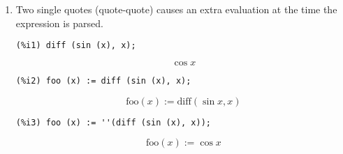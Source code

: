 \documentclass[12pt,leqno]{article}
\begin{document}
\begin{enumerate}
\item Two single quotes (quote-quote) causes an extra evaluation at the time the expression is parsed.
\begin{verbatim}
(%i1) diff (sin (x), x);
\end{verbatim}
\begin{equation}
\cos x\tag{\%o1}
\label{eq:doc-group1-code17-1-1}
\end{equation}
\begin{verbatim}
(%i2) foo (x) := diff (sin (x), x);
\end{verbatim}
\begin{equation}
\mathrm{foo}\left(x\right):=\mathrm{diff}\left(\sin x , x\right)\tag{\%o2}
\label{eq:doc-group1-code17-2-1}
\end{equation}
\begin{verbatim}
(%i3) foo (x) := ''(diff (sin (x), x));
\end{verbatim}
\begin{equation}
\mathrm{foo}\left(x\right):=\cos x\tag{\%o3}
\label{eq:doc-group1-code17-3-1}
\end{equation}



\end{enumerate}
\end{document}
